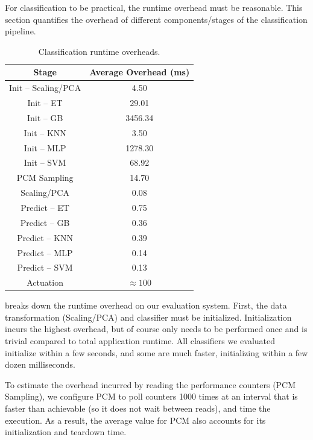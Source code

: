 For classification to be practical, the runtime overhead must be reasonable.
This section quantifies the overhead of different components/stages of the classification pipeline.

\begin{table}[t]
\caption{Classification runtime overheads.}
\label{tbl:classifiers-overhead}
\small
\centering
\begin{tabular}{cc}
  \textbf{Stage} & \textbf{Average Overhead (ms)} \\
  \hline
  \hline
  Init -- Scaling/PCA & 4.50 \\
  Init -- ET          & 29.01 \\
  Init -- GB          & 3456.34 \\
  Init -- KNN         & 3.50 \\
  Init -- MLP         & 1278.30 \\
  Init -- SVM         & 68.92 \\
  \hline
  PCM Sampling        & 14.70 \\
  Scaling/PCA         & 0.08 \\
  Predict -- ET       & 0.75 \\
  Predict -- GB       & 0.36 \\
  Predict -- KNN      & 0.39 \\
  Predict -- MLP      & 0.14 \\
  Predict -- SVM      & 0.13 \\
  Actuation & $\approx 100$ \\
  \hline
  \hline
\end{tabular}
\end{table}

 breaks down the runtime overhead on our evaluation system.
First, the data transformation (Scaling/PCA) and classifier must be initialized.
Initialization incurs the highest overhead, but of course only needs to be performed once and is trivial compared to total application runtime.
All classifiers we evaluated initialize within a few seconds, and some are much faster, initializing within a few dozen milliseconds.

To estimate the overhead incurred by reading the performance counters (PCM Sampling), we configure PCM to poll counters 1000 times at an interval that is faster than achievable (so it does not wait between reads), and time the execution.
As a result, the average value for PCM also accounts for its initialization and teardown time.


